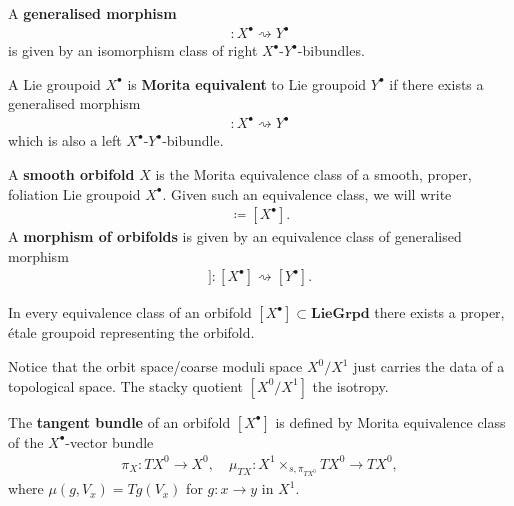 \documentclass[psamsfonts]{amsart}
\theoremstyle{plain}
\theoremstyle{definition}{
\newtheorem{defi}{Definition}[section]
\newtheorem{ass}{Assumption}
\newtheorem*{nota}{Notation}}
\theoremstyle{remark}{
\newtheorem{rem}{Remark}
\newtheorem{ex}{Example}}
\theoremstyle{plain}{
\newtheorem{thm}{Theorem}[section]
\newtheorem{lem}{Lemma}[section]
\newtheorem{cor}{Corollary}[section]
\newtheorem{prop}{Proposition}[section]
\newtheorem{con}{Conjecture}[section]}
\newcommand{\cat}[1]{\textbf{#1}}
\begin{document}
\begin{defi}
A \textbf{generalised morphism} 
\begin{align*}
    [Z]\colon X^\bullet\rightsquigarrow Y^\bullet
\end{align*}
is given by an isomorphism class of right $X^\bullet$-$Y^\bullet$-bibundles.
\end{defi}

\begin{defi}
A Lie groupoid $X^\bullet$ is \textbf{Morita equivalent} to Lie groupoid $Y^\bullet$ if there exists a generalised morphism 
\begin{align*}
    [Z]\colon X^\bullet\rightsquigarrow Y^\bullet
\end{align*}
which is also a left $X^\bullet$-$Y^\bullet$-bibundle.
\end{defi}



\begin{defi}
A \textbf{smooth orbifold} $X$ is the Morita equivalence class of a smooth, proper, foliation Lie groupoid $X^\bullet$. Given such an equivalence class, we will write  
\begin{align*}
    [X^0/X^1]\coloneqq[X^\bullet].
\end{align*}
A \textbf{morphism of orbifolds} is given by an equivalence class of generalised morphism 
\begin{align*}
    [[Z]]\colon [X^\bullet]\rightsquigarrow[Y^\bullet].
\end{align*}
\end{defi}

\begin{rem}
In every equivalence class of an orbifold $[X^\bullet]\subset\cat{LieGrpd}$ there exists a proper, étale groupoid representing the orbifold. 
\end{rem}

\begin{rem}
Notice that the orbit space/coarse moduli space $X^0/X^1$ just carries the data of a topological space. The stacky quotient $[X^0/X^1]$  the isotropy.
\end{rem}

\begin{defi}
The \textbf{tangent bundle} of an orbifold $[X^\bullet]$ is defined by Morita equivalence class of the $X^\bullet$-vector bundle 
\begin{align*}
    \pi_X\colon TX^0 \rightarrow X^0,\quad \mu_{TX}\colon X^1 \times_{s, \pi_{TX^0}} TX^0 \rightarrow TX^0,
\end{align*}
where $\mu(g, V_x) = T g(V_x)$ for $g\colon  x \to y$ in $X^1$. 
\end{defi}
\end{document}
